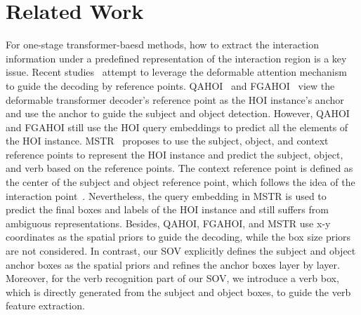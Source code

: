 \documentclass[10pt,twocolumn,letterpaper]{article}
\begin{document}
\section{Related Work}
\quad For one-stage transformer-baesd methods, how to extract the interaction information under a predefined representation of the interaction region is a key issue.
Recent studies~\cite{cjw_qahoi,ma2023fgahoi,Kim_2022_CVPR} attempt to leverage the deformable attention mechanism~\cite{zhu2020deformable} to guide the decoding by reference points.
QAHOI~\cite{cjw_qahoi} and FGAHOI~\cite{ma2023fgahoi} view the deformable transformer decoder's reference point as the HOI instance's anchor and use the anchor to guide the subject and object detection.
However, QAHOI and FGAHOI still use the HOI query embeddings to predict all the elements of the HOI instance.
MSTR~\cite{Kim_2022_CVPR} proposes to use the subject, object, and context reference points to represent the HOI instance and predict the subject, object, and verb based on the reference points.
The context reference point is defined as the center of the subject and object reference point, which follows the idea of the interaction point~\cite{liao2020ppdm,wang2020learning,zhong2021glance}.
Nevertheless, the query embedding in MSTR is used to predict the final boxes and labels of the HOI instance and still suffers from ambiguous representations.
Besides, QAHOI, FGAHOI, and MSTR use x-y coordinates as the spatial priors to guide the decoding, while the box size priors are not considered.
In contrast, our SOV explicitly defines the subject and object anchor boxes as the spatial priors and refines the anchor boxes layer by layer.
Moreover, for the verb recognition part of our SOV, we introduce a verb box, which is directly generated from the subject and object boxes, to guide the verb feature extraction.
\end{document}
